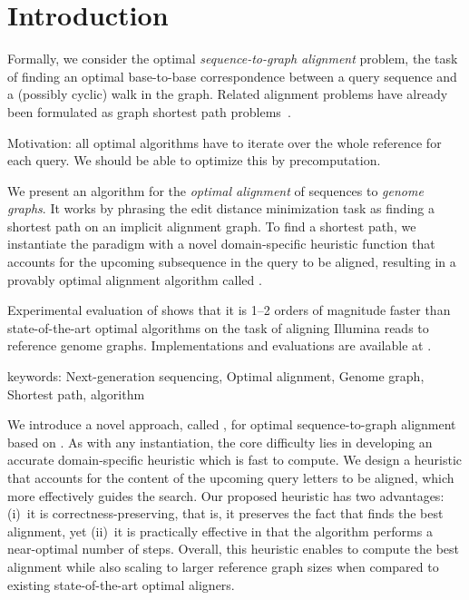 \section{Introduction}

Formally, we consider the optimal \emph{sequence-to-graph alignment} problem,
the task of finding an optimal base-to-base correspondence between a query
sequence and a (possibly cyclic) walk in the graph. Related alignment problems
have already been formulated as graph shortest path
problems~\cite{jain_complexity_2019}.

Motivation: all optimal algorithms have to iterate over the whole reference for
each query. We should be able to optimize this by precomputation.

We present an algorithm for the \emph{optimal alignment} of sequences to
\emph{genome graphs}. It works by phrasing the edit distance minimization
task as finding a shortest path on an implicit alignment graph. To find a
shortest path, we instantiate the \A paradigm with a novel domain-specific
heuristic function that accounts for the upcoming subsequence in the query
to be aligned, resulting in a provably optimal alignment algorithm called
\astarix.

\quad \quad Experimental evaluation of \astarix shows that it is 1--2
orders of magnitude faster than state-of-the-art optimal algorithms on the
task of aligning Illumina reads to reference genome graphs. Implementations
and evaluations are available at \mbox{\astarixurl}.

keywords: Next-generation sequencing, Optimal alignment, Genome graph,
Shortest path, \A algorithm

We introduce a novel approach, called \astarix, for optimal sequence-to-graph
alignment based on \A. As with any \A instantiation, the core difficulty lies in
developing an accurate domain-specific heuristic which is fast to compute. We
design a heuristic that accounts for the content of the upcoming query letters
to be aligned, which more effectively guides the search. Our proposed heuristic
has two advantages: (i)~it is correctness-preserving, that is, it preserves the
fact that \astarix finds the best alignment, yet (ii)~it is practically
effective in that the algorithm performs a near-optimal number of steps.
Overall, this heuristic enables \astarix to compute the best alignment while
also scaling to larger reference graph sizes when compared to existing
state-of-the-art optimal aligners.

